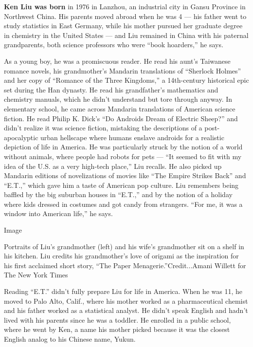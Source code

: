 \textbf{Ken Liu was born} in 1976 in Lanzhou, an industrial city in
Gansu Province in Northwest China. His parents moved abroad when he was
4 --- his father went to study statistics in East Germany, while his
mother pursued her graduate degree in chemistry in the United States ---
and Liu remained in China with his paternal grandparents, both science
professors who were ``book hoarders,'' he says.

As a young boy, he was a promiscuous reader. He read his aunt's
Taiwanese romance novels, his grandmother's Mandarin translations of
``Sherlock Holmes'' and her copy of ``Romance of the Three Kingdoms,'' a
14th-century historical epic set during the Han dynasty. He read his
grandfather's mathematics and chemistry manuals, which he didn't
understand but tore through anyway. In elementary school, he came across
Mandarin translations of American science fiction. He read Philip K.
Dick's ``Do Androids Dream of Electric Sheep?'' and didn't realize it
was science fiction, mistaking the descriptions of a post-apocalyptic
urban hellscape where humans enslave androids for a realistic depiction
of life in America. He was particularly struck by the notion of a world
without animals, where people had robots for pets --- ``It seemed to fit
with my idea of the U.S. as a very high-tech place,'' Liu recalls. He
also picked up Mandarin editions of novelizations of movies like ``The
Empire Strikes Back'' and ``E.T.,'' which gave him a taste of American
pop culture. Liu remembers being baffled by the big suburban houses in
``E.T.,'' and by the notion of a holiday where kids dressed in costumes
and got candy from strangers. ``For me, it was a window into American
life,'' he says.

Image

Portraits of Liu's grandmother (left) and his wife's grandmother sit on
a shelf in his kitchen. Liu credits his grandmother's love of origami as
the inspiration for his first acclaimed short story, ``The Paper
Menagerie.''Credit...Amani Willett for The New York Times

Reading ``E.T.'' didn't fully prepare Liu for life in America. When he
was 11, he moved to Palo Alto, Calif., where his mother worked as a
pharmaceutical chemist and his father worked as a statistical analyst.
He didn't speak English and hadn't lived with his parents since he was a
toddler. He enrolled in a public school, where he went by Ken, a name
his mother picked because it was the closest English analog to his
Chinese name, Yukun.

